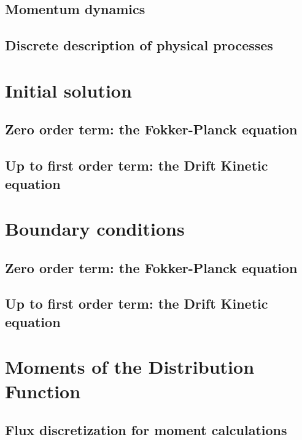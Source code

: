 \documentclass[11pt,a4paper]{report}
\begin{document}
		\subsection{Momentum dynamics}
		

		\subsection{Discrete description of physical processes}
		

	\section{Initial solution}

		\subsection{Zero order term: the Fokker-Planck equation}
		

		\subsection{Up to first order term: the Drift Kinetic equation}
		

	\section{Boundary conditions}

		\subsection{Zero order term: the Fokker-Planck equation}
		

		\subsection{Up to first order term: the Drift Kinetic equation}
		

	\section{Moments of the Distribution Function}

		\subsection{Flux discretization for moment calculations}
		
\end{document}
